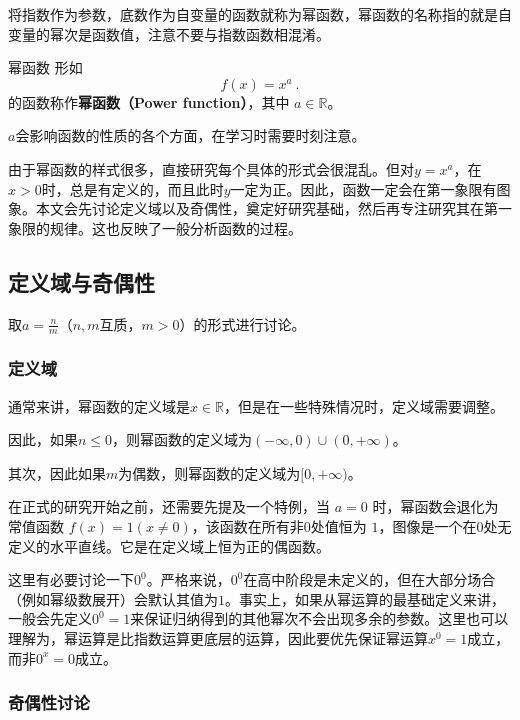 将指数作为参数，底数作为自变量的函数就称为幂函数，幂函数的名称指的就是自变量的幂次是函数值，注意不要与指数函数相混淆。

\begin{definition}{幂函数}
形如
\begin{equation}
f(x) = x^a~.
\end{equation}
的函数称作\textbf{幂函数（Power function）}，其中 $a\in\mathbb R$。
\end{definition}

$a$会影响函数的性质的各个方面，在学习时需要时刻注意。

由于幂函数的样式很多，直接研究每个具体的形式会很混乱。但对$y=x^a$，在$x>0$时，总是有定义的，而且此时$y$一定为正。因此，函数一定会在第一象限有图象。本文会先讨论定义域以及奇偶性，奠定好研究基础，然后再专注研究其在第一象限的规律。这也反映了一般分析函数的过程。



\subsection{定义域与奇偶性}\label{sub_power_1}

取$\displaystyle a=\frac{n}{m}$（$n,m$互质，$m>0$）的形式进行讨论。

\subsubsection{定义域}

通常来讲，幂函数的定义域是$x\in\mathbb{R}$，但是在一些特殊情况时，定义域需要调整。

因此，如果$n\leq0$，则幂函数的定义域为$({-\infty},0)\cup(0,{+\infty})$。

其次，因此如果${m}$为偶数，则幂函数的定义域为$[0,{+\infty})$。

在正式的研究开始之前，还需要先提及一个特例，当 $a = 0$ 时，幂函数会退化为常值函数 $f(x) = 1(x\neq0)$，该函数在所有非$0$处值恒为 $1$，图像是一个在$0$处无定义的水平直线。它是在定义域上恒为正的偶函数。

这里有必要讨论一下$0^0$。严格来说，$0^0$在高中阶段是未定义的，但在大部分场合（例如幂级数展开）会默认其值为$1$。事实上，如果从幂运算的最基础定义来讲，一般会先定义$0^0=1$来保证归纳得到的其他幂次不会出现多余的参数。这里也可以理解为，幂运算是比指数运算更底层的运算，因此要优先保证幂运算$x^0=1$成立，而非$0^x=0$成立。

\subsubsection{奇偶性讨论}


